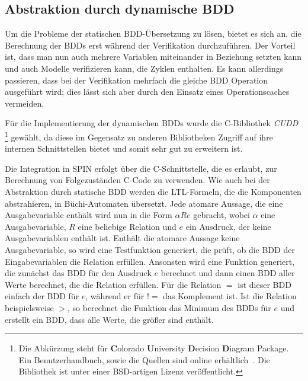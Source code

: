 \subsection{Abstraktion durch dynamische BDD}
Um die Probleme der statischen BDD-Übersetzung zu lösen, bietet es sich an, die Berechnung der BDDs erst während der Verifikation durchzuführen.
Der Vorteil ist, dass man nun auch mehrere Variablen miteinander in Beziehung setzten kann und auch Modelle verifizieren kann, die Zyklen enthalten.
Es kann allerdings passieren, dass bei der Verifikation mehrfach die gleiche BDD Operation ausgeführt wird; dies lässt sich aber durch den Einsatz eines Operationscaches vermeiden.

Für die Implementierung der dynamischen BDDs wurde die C-Bibliothek \emph{CUDD}
\footnote{Die Abkürzung steht für {\bf C}olorado {\bf U}niversity {\bf D}ecision {\bf D}iagram Package.
  Ein Benutzerhandbuch, sowie die Quellen sind online erhältlich~\cite{cudd}.
  Die Bibliothek ist unter einer BSD-artigen Lizenz veröffentlicht.
}
gewählt, da diese im Gegensatz zu anderen Bibliotheken Zugriff auf ihre internen Schnittstellen bietet und somit sehr gut zu erweitern ist.

Die Integration in SPIN erfolgt über die C-Schnittstelle, die es erlaubt, zur Berechnung von Folgezuständen C-Code zu verwenden.
Wie auch bei der Abstraktion durch statische BDD werden die LTL-Formeln, die die Komponenten abstrahieren, in Büchi-Automaten übersetzt.
Jede atomare Aussage, die eine Ausgabevariable enthält wird nun in die Form $\alpha R e$ gebracht, wobei $\alpha$ eine Ausgabevariable, $R$ eine beliebige Relation und $e$ ein Ausdruck, der keine Ausgabevariablen enthält ist.
Enthält die atomare Aussage keine Ausgabevariable, so wird eine Testfunktion generiert, die prüft, ob die BDD der Eingabevariablen die Relation erfüllen.
Ansonsten wird eine Funktion generiert, die zunächst das BDD für den Ausdruck $e$ berechnet und dann einen BDD aller Werte berechnet, die die Relation erfüllen.
Für die Relation $=$ ist dieser BDD einfach der BDD für $e$, während er für $!=$ das Komplement ist.
Ist die Relation beispielsweise $>$, so berechnet die Funktion das Minimum des BDDs für $e$ und erstellt ein BDD, dass alle Werte, die größer sind enthält.
